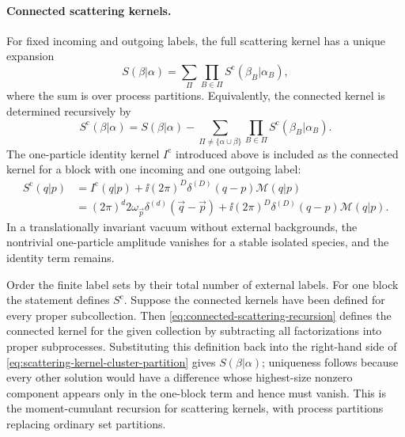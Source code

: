 \paragraph{Connected scattering kernels.}
For fixed incoming and outgoing labels, the full scattering kernel has a unique
expansion
\begin{equation}
  S(\beta|\alpha)
  =
  \sum_{\Pi}
  \prod_{B\in\Pi}S^{\mathrm c}(\beta_B|\alpha_B),
  \label{eq:scattering-kernel-cluster-partition}
\end{equation}
where the sum is over process partitions.  Equivalently, the connected kernel
is determined recursively by
\begin{equation}
  S^{\mathrm c}(\beta|\alpha)
  =
  S(\beta|\alpha)
  -
  \sum_{\Pi\ne\{\alpha\cup\beta\}}
  \prod_{B\in\Pi}S^{\mathrm c}(\beta_B|\alpha_B).
  \label{eq:connected-scattering-recursion}
\end{equation}
The one-particle identity kernel \(I^{\mathrm c}\) introduced above is included
as the connected kernel for a block with one incoming and one outgoing label:
\begin{equation}
  \begin{aligned}
  S^{\mathrm c}(q|p)
  &=
  I^{\mathrm c}(q|p)
  +
  \ii(2\pi)^D\delta^{(D)}(q-p)\mathcal M(q|p)
  \\
  &=
  (2\pi)^d2\omega_{\vec p}\delta^{(d)}(\vec q-\vec p)
  +
  \ii(2\pi)^D\delta^{(D)}(q-p)\mathcal M(q|p).
  \end{aligned}
  \label{eq:one-particle-connected-kernel}
\end{equation}
In a translationally invariant vacuum without external backgrounds, the
nontrivial one-particle amplitude vanishes for a stable isolated species, and
the identity term remains.

Order the finite label sets by their total number of external labels.  For one
block the statement defines \(S^{\mathrm c}\).  Suppose the connected kernels
have been defined for every proper subcollection.  Then
\eqref{eq:connected-scattering-recursion} defines the connected kernel for the
given collection by subtracting all factorizations into proper subprocesses.
Substituting this definition back into the right-hand side of
\eqref{eq:scattering-kernel-cluster-partition} gives \(S(\beta|\alpha)\);
uniqueness follows because every other solution would have a difference whose
highest-size nonzero component appears only in the one-block term and hence
must vanish.  This is the moment-cumulant recursion for scattering kernels,
with process partitions replacing ordinary set partitions.

